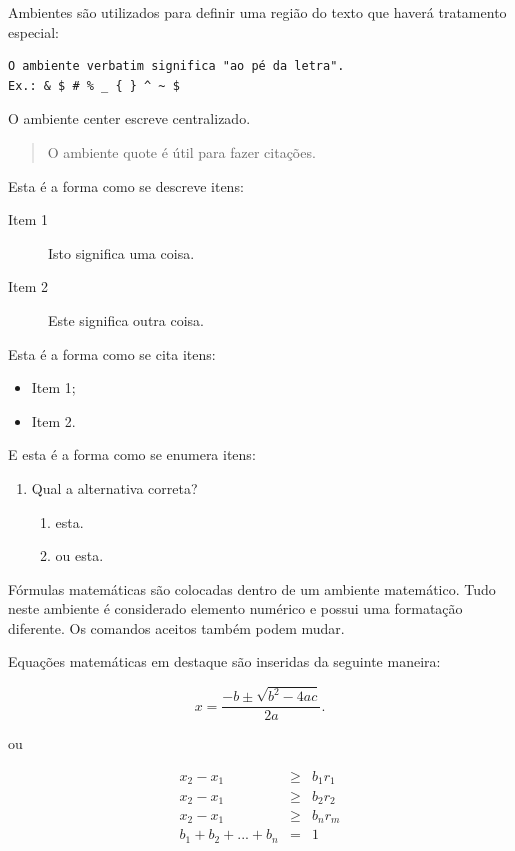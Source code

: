 Ambientes são utilizados para definir uma região do texto que haverá tratamento especial:

\begin{verbatim}
O ambiente verbatim significa "ao pé da letra". 
Ex.: & $ # % _ { } ^ ~ $
\end{verbatim}

\begin{center}
O ambiente center escreve centralizado.
\end{center}

\begin{quote}
O ambiente quote é útil para fazer citações.
\end{quote}

Esta é a forma como se descreve itens:
\begin{description}
\item[Item 1] Isto significa uma coisa.
\item[Item 2] Este significa outra coisa.
\end{description}

Esta é a forma como se cita itens:
\begin{itemize}
\item Item 1;
\item Item 2.
\end{itemize}

E esta é a forma como se enumera itens:
\begin{enumerate}
	\item Qual a alternativa correta?
		\begin{enumerate}
			\item esta.
			\item ou esta.
		\end{enumerate}
\end{enumerate}

Fórmulas matemáticas são colocadas dentro de um ambiente matemático. Tudo neste ambiente é considerado elemento numérico e possui uma formatação diferente. Os comandos aceitos também podem mudar.

Equações matemáticas em destaque são inseridas da seguinte maneira:

$$
x=\frac{-b\pm\sqrt{b^2-4ac}}{2a}.
$$

ou 

\begin{equation}
\begin{array}{rcl}
x_2 - x_1 &\geq& b_1 r_1\\
x_2 - x_1 &\geq& b_2 r_2\\
x_2 - x_1 &\geq& b_n r_m\\
b_1 + b_2 + ... + b_n &=& 1
\end{array}
\end{equation}

